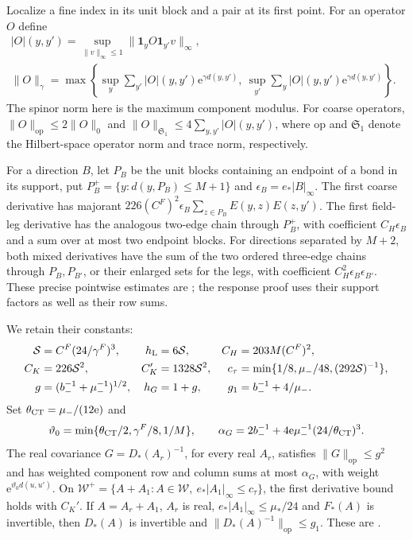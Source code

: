 Localize a fine index in its unit block and a pair at its first
point. For an operator $O$ define
\begin{align*}
 |O|(y,y')=\sup_{\|v\|_\infty\le1}
                       \|\mathbf1_yO\mathbf1_{y'}v\|_\infty,\qquad&\\
 \|O\|_\gamma=\max\left\{
 \sup_y\sum_{y'}|O|(y,y')\mathrm e^{\gamma d(y,y')},\
 \sup_{y'}\sum_y|O|(y,y')\mathrm e^{\gamma d(y,y')}\right\}.&
\end{align*}
The spinor norm here is the maximum component modulus.
For coarse operators, $\|O\|_{\mathrm{op}}\le2\|O\|_0$ and
$\|O\|_{\mathfrak S_1}\le4\sum_{y,y'}|O|(y,y')$, where
$\mathrm{op}$ and $\mathfrak S_1$ denote the Hilbert-space operator
norm and trace norm, respectively.

For a direction $B$, let $P_B$ be the unit blocks containing
an endpoint of a bond in its support, put
$P_B^+=\{y:d(y,P_B)\le M+1\}$ and
$\epsilon_B=e_*|B|_\infty$.
The first coarse derivative has majorant
$226(C^F)^2\epsilon_B\sum_{z\in P_B}E(y,z)E(z,y')$.
The first field-leg derivative has the analogous two-edge chain
through $P_B^+$, with coefficient $C_H\epsilon_B$ and a sum
over at most two endpoint blocks. For directions separated by
$M+2$, both mixed derivatives have the sum of the two ordered
three-edge chains through $P_B,P_{B'}$, or their enlarged sets
for the legs, with coefficient $C_H^2\epsilon_B\epsilon_{B'}$.
These precise pointwise estimates are
\cite[Proposition~A.1]{TerminalPressure}; the response proof uses
their support factors as well as their row sums.

We retain their constants:
\begin{align*}
 \mathcal S&=C^F(24/\gamma^F)^3,&
 h_{\rm L}&=6\mathcal S,& C_H&=203M(C^F)^2,\\
 C_K&=226\mathcal S^2,& C_K'&=1328\mathcal S^2,&
 c_\tau&=\min\{1/8,\mu_-/48,(292\mathcal S)^{-1}\},\\
 g&=(b_-^{-1}+\mu_-^{-1})^{1/2},&h_G&=1+g,&g_1&=b_-^{-1}+4/\mu_-.
\end{align*}
Set $\theta_{\rm CT}=\mu_-/(12\mathrm e)$ and
\[
 \vartheta_0=\min\{\theta_{\rm CT}/2,\gamma^F/8,1/M\},\qquad
 \alpha_G=2b_-^{-1}
           +4\mathrm e\mu_-^{-1}(24/\theta_{\rm CT})^3.
\]
The real covariance $G=D_*(A_r)^{-1}$, for every real $A_r$,
satisfies $\|G\|_{\mathrm{op}}\le g^2$ and has weighted component row and
column sums at most $\alpha_G$, with weight
$\mathrm e^{\vartheta_0d(u,u')}$.
On $\mathcal W^+=\{A+A_1:A\in\mathcal W,\ e_*|A_1|_\infty\le c_\tau\}$,
the first derivative bound holds with $C_K'$.
If $A=A_r+A_1$, $A_r$ is real, $e_*|A_1|_\infty\le\mu_*/24$
and $F_*(A)$ is invertible, then $D_*(A)$ is invertible and
$\|D_*(A)^{-1}\|_{\mathrm{op}}\le g_1$.
These are \cite[(72)--(75)]{TerminalPressure}.

